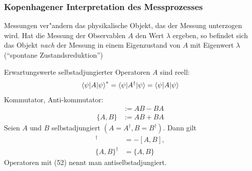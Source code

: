 \documentclass[a4paper]{scrartcl}
\begin{document}
{\subsubsection*{Kopenhagener Interpretation des Messprozesses}
Messungen ver"andern das physikalische Objekt, das der Messung unterzogen wird. Hat die Messung der Observablen $A$ den Wert $\lambda$ ergeben, so befindet sich das Objekt \emph{nach} der Messung in einem Eigenzustand von $A$ mit Eigenwert $\lambda$ ("`spontane Zustandsreduktion"')

Erwartungswerte selbstadjungierter Operatoren $A$ sind reell:
\begin{align} \braket{ \psi | A | \psi}^* = \braket{ \psi | A^\dagger | \psi} = \braket{ \psi | A | \psi}
\end{align}
Kommutator, Anti-kommutator:
\begin{align}
[A,B] & := AB - BA \\
\{ A,B \} & := AB + BA
\end{align}
Seien $A$ und $B$ selbstadjungiert $(A = A^\dagger, B = B ^\dagger)$. Dann gilt
\begin{align}
[A,B]^\dagger & = - [A,B], \\
\{ A, B \}^\dagger & = \{ A, B \}
\end{align}
Operatoren mit (52) nennt man antiselbstadjungiert.

}
\end{document}

